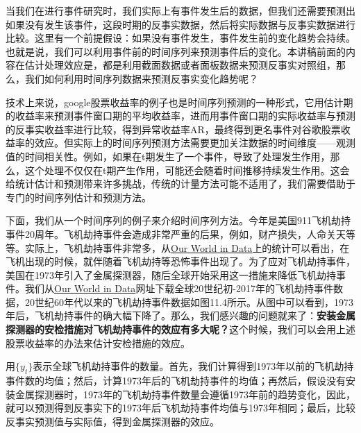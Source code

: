 \documentclass[cn,12pt,math=newtx,citestyle=gb7714-2015,bibstyle=gb7714-2015]{elegantbook}
\begin{document}
    当我们在进行事件研究时，我们实际上有事件发生后的数据，但我们还需要预测出如果没有发生该事件，这段时期的反事实数据，然后将实际数据与反事实数据进行比较。这里有一个前提假设：如果没有事件发生，事件发生前的变化趋势会持续。也就是说，我们可以利用事件前的时间序列来预测事件后的变化。本讲稿前面的内容在估计处理效应是，都是利用截面数据或者面板数据来预测反事实对照组，那么，我们如何利用时间序列数据来预测反事实变化趋势呢？
    
    技术上来说，google股票收益率的例子也是时间序列预测的一种形式，它用估计期的收益率来预测事件窗口期的平均收益率，进而用事件窗口期的实际收益率与预测的反事实收益率进行比较，得到异常收益率AR，最终得到更名事件对谷歌股票收益率的效应。但实际上的时间序列预测方法需要更加关注数据的时间维度——观测值的时间相关性。例如，如果在t期发生了一个事件，导致了处理发生作用，那么，这个处理不仅仅在t期产生作用，可能还会随着时间推移持续发生作用。这会给统计估计和预测带来许多挑战，传统的计量方法可能不适用了，我们需要借助于专门的时间序列估计和预测方法。
	
	下面，我们从一个时间序列的例子来介绍时间序列方法。今年是美国911飞机劫持事件20周年。飞机劫持事件会造成非常严重的后果，例如，财产损失，人命关天等等。实际上，飞机劫持事件非常多，从\href{https://ourworldindata.org/terrorism}{Our World in Data}上的统计可以看出，在飞机出现的时候，就伴随着飞机劫持等恐怖事件出现了。为了应对飞机劫持事件，美国在1973年引入了金属探测器，随后全球开始采用这一措施来降低飞机劫持事件。我们从\href{https://ourworldindata.org/terrorism}{Our World in Data}网址下载全球20世纪初-2017年的飞机劫持事件数据，20世纪60年代以来的飞机劫持事件数据如图11.4所示。从图中可以看到，1973年后，飞机劫持事件的确大幅下降了。那么，我们感兴趣的问题就来了：\textbf{安装金属探测器的安检措施对飞机劫持事件的效应有多大呢？}这个时候，我们可以会用上述股票收益率的办法来估计安检措施的效应。
	
	用$\{y_t\}$表示全球飞机劫持事件的数量。首先，我们计算得到1973年以前的飞机劫持事件数的均值；然后，计算1973年后的飞机劫持事件的均值；再然后，假设没有安装金属探测器时，1973年的飞机劫持事件数量会遵循1973年前的趋势变化，因此，就可以预测得到反事实下的1973年后飞机劫持事件均值与1973年相同；最后，比较反事实预测值与实际值，得到金属探测器的效应。
	
\end{document}
